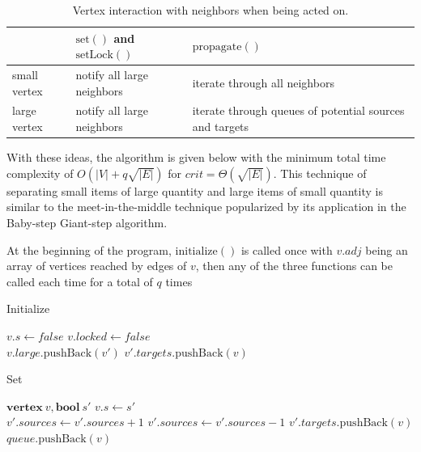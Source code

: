 \documentclass[12pt]{report}
\begin{document}
\begin{table}[h]
\footnotesize
\centering
\begin{tabular}{|l|l|l|}
	\hline
				 & $ \mathrm{set}() $ and $ \mathrm{setLock}() $ & $ \mathrm{propagate}() $                                \\ \hline
	small vertex & notify all large neighbors                    & iterate through all neighbors                           \\ \hline
	large vertex & notify all large neighbors                    & iterate through queues of potential sources and targets \\ \hline
\end{tabular}
\caption{Vertex interaction with neighbors when being acted on.}
\label{tbl:vert_int}
\end{table}

With these ideas, the algorithm is given below with the minimum total time complexity of $ O\left(\lvert V \rvert + q \sqrt{\lvert E \rvert} \right) $ for $ \mathit{crit} = \Theta(\sqrt{\lvert E \rvert}) $.
This technique of separating small items of large quantity and large items of small quantity is similar to the meet-in-the-middle technique popularized by its application in the Baby-step Giant-step algorithm.\cite{shanks71}

\bigskip

At the beginning of the program, $ \mathrm{initialize}() $ is called once with $ v.\mathit{adj} $ being an array of vertices reached by edges of $ v $, then any of the three functions can be called each time for a total of $ q $ times

\begin{algorithm}[H]
\caption{Initialize}
\begin{algorithmic}
	\State $ v.s \gets \mathit{false} $
	\State $ v.\mathit{locked} \gets \mathit{false} $
	\\
			\State $ v.\mathit{large}.\mathrm{pushBack}(v') $
			\State $ v'.\mathit{targets}.\mathrm{pushBack}(v) $
		\EndIf
	\EndFor
\EndFor
\end{algorithmic}
\end{algorithm}

\begin{algorithm}[H]
\caption{Set}
\begin{algorithmic}
\Require $ \mathbf{vertex}\ v, \mathbf{bool}\ s' $
	\State \Return
\EndIf
\State $ v.s \gets s' $
\\
		\State $ v'.\mathit{sources} \gets v'.\mathit{sources} + 1 $
	\EndFor
\Else
		\State $ v'.\mathit{sources} \gets v'.\mathit{sources} - 1 $
		\State $ v'.\mathit{targets}.\mathrm{pushBack}(v) $
	\EndFor
\EndIf
\State $ \mathit{queue}.\mathrm{pushBack}(v) $
\end{algorithmic}
\end{algorithm}
\end{document}
